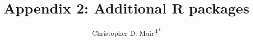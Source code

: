 \documentclass[utf8]{frontiersSCNS}
\def\Authors{
  Christopher D. Muir\,\textsuperscript{1*}}
\def\firstAuthorLast{Muir {et~al.}}
\begin{document}
\onecolumn
{}

\title[]{Appendix 2: Additional R packages}
\author[\firstAuthorLast]{\Authors}
\address{} %
\correspondance{} %

\extraAuth{}%


\maketitle
\end{document}

